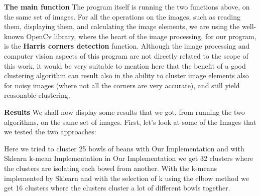 \documentclass[12pt]{article}
\begin{document}
\textbf{The main function} \newline
The program itself is running the two functions above, on the same set of images. \newline
For all the operations on the images, such as reading them, displaying them, and calculating the image elements, we are using the well-known OpenCv library,
where the heart of the image processing, for our program, is the \textbf{Harris corners detection} function. \newline
Although the image processing and computer vision aspects of this program are not directly related to the scope of this work, it would be very suitable to mention here that the benefit of a good clustering algorithm can result also in the ability to cluster image elements also for noisy images (where not all the corners are very accurate), and still yield reasonable clustering.

\textbf{Results}
We shall now display some results that we got, from running the two algorithms, on the same set of images. \newline
\newline
First, let's look at some of the Images that we tested the two approaches:

\newline

\begin{figure}[ht]
    \centering
        \xspace
        \xspace
        \xspace
\end{figure}
\newpage

\newline
Here  we tried to cluster 25 bowls of beans with Our Implementation and with Sklearn k-mean Implementation in Our Implementation we get 32 clusters where the clusters are isolating each bowel from another.\newline
With the k-means implemented by Sklearn and with the selection of k using the elbow method we get 16 clusters where the clusters cluster a lot of different bowls together. 
\newline

\begin{figure}[ht]
    \centering
        \xspace
\end{figure}
\newpage
\end{document}
